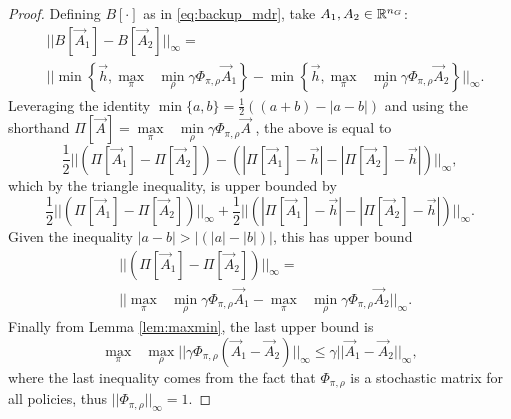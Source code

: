 \begin{proof} Defining $B[\cdot]$ as in \eqref{eq:backup_mdr}, take $A_1, A_2 \in \mathbb{R}^{n_G}$:
\begin{equation*}
\begin{split}
&||B[\vec{A}_1] - B[\vec{A}_2]||_{\infty}=\\
&||\min\left\{ \vec{h}, \underset{\pi}{\max}\text{ }\underset{ \rho}{\min} \gamma \Phi_{\pi, \rho} \vec{A}_1 \right \}  - \min\left\{ \vec{h}, \underset{\pi}{\max}\text{ }\underset{ \rho}{\min} \gamma \Phi_{\pi, \rho} \vec{A}_2 \right \}||_{\infty}
 .
\end{split}
\end{equation*}%
\noindent Leveraging the identity $\min\{a,b\} = \frac{1}{2}((a+b)- |a-b|)$ and using the shorthand $\Pi[\vec{A}]=\underset{\pi}{\max}\text{ }\underset{ \rho}{\min} \gamma \Phi_{\pi, \rho} \vec{A}$ , the above is equal to 
%
\begin{equation*}
\frac{1}{2} ||(\Pi[\vec{A}_1]  - \Pi[\vec{A}_2] ) -  (|\Pi[\vec{A}_1]-\vec{h}|  - |\Pi[\vec{A}_2]-\vec{h}|)||_{\infty} ,
\end{equation*}%
\noindent which by the triangle inequality, is upper bounded by
%
\begin{equation*}
\frac{1}{2} ||(\Pi[\vec{A}_1]  - \Pi[\vec{A}_2] )||_{\infty} + \frac{1}{2}  ||(|\Pi[\vec{A}_1]-\vec{h}|  - |\Pi[\vec{A}_2]-\vec{h}|)||_{\infty} .
\end{equation*}%
\noindent Given the inequality $|a-b| > |(|a|-|b|)|$, this has upper bound
%
\begin{equation*}
\begin{split}
&||(\Pi[\vec{A}_1]  - \Pi[\vec{A}_2] )||_{\infty}=\\ 
&||\underset{\pi}{\max}\text{ }\underset{ \rho}{\min} \gamma \Phi_{\pi, \rho}\vec{A}_1 - \underset{\pi}{\max}\text{ }\underset{ \rho}{\min} \gamma \Phi_{\pi, \rho} \vec{A}_2||_{\infty} .
\end{split}
\end{equation*}%
\noindent Finally from Lemma \ref{lem:maxmin}, the last upper bound is 
\begin{equation*}
\underset{\pi}{\max}\text{ }\underset{ \rho}{\max} ||\gamma \Phi_{\pi, \rho} (\vec{A}_1 - \vec{A}_2)||_{\infty} \leq \gamma||\vec{A}_1 - \vec{A}_2||_{\infty} ,
\end{equation*}%
\noindent where the last inequality comes from the fact that $\Phi_{\pi, \rho}$ is a stochastic matrix for all policies, thus $||\Phi_{\pi, \rho}||_{\infty} = 1$.
\end{proof}



